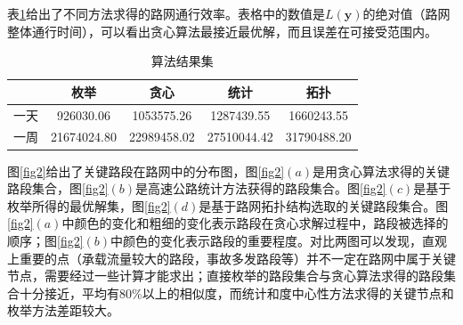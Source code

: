 				表\ref{tab:5}给出了不同方法求得的路网通行效率。表格中的数值是$L(\bm{y})$的绝对值（路网整体通行时间），可以看出贪心算法最接近最优解，而且误差在可接受范围内。

				\begin{table}[h]
				\centering
				\begin{tabular}{|c|c|c|c|c|}
				\hline
				\hline
				   &   枚举 &   贪心 &   统计 &   拓扑 \\
				\hline
				  一天 &  926030.06 & 1053575.26 & 1287439.55 & 1660243.55 \\
				\hline
				  一周 &  21674024.80 & 22989458.02 & 27510044.42 & 31790488.20 \\
				\hline
				\end{tabular}
				\caption{算法结果集}
				\label{tab:5}
				\end{table} 



				图\ref{fig2}给出了关键路段在路网中的分布图，图\ref{fig2}$(a)$是用贪心算法求得的关键路段集合，图\ref{fig2}$(b)$是高速公路统计方法获得的路段集合。图\ref{fig2}$(c)$是基于枚举所得的最优解集，图\ref{fig2}$(d)$是基于路网拓扑结构选取的关键路段集合。图\ref{fig2}$(a)$中颜色的变化和粗细的变化表示路段在贪心求解过程中，路段被选择的顺序；图\ref{fig2}$(b)$中颜色的变化表示路段的重要程度。对比两图可以发现，直观上重要的点（承载流量较大的路段，事故多发路段等）并不一定在路网中属于关键节点，需要经过一些计算才能求出；直接枚举的路段集合与贪心算法求得的路段集合十分接近，平均有80\%以上的相似度，而统计和度中心性方法求得的关键节点和枚举方法差距较大。

